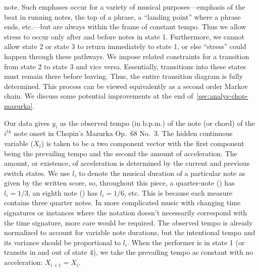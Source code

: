 \documentclass[12pt]{article}
\begin{document}
note. Such emphases occur for a variety of musical purposes---emphasis
of the beat in running notes, the top of a
phrase, a ``landing point'' where a phrase ends, etc.---but are always
within the frame of constant tempo. Thus we allow stress to occur only
after and before notes in state 1. Furthermore, we cannot allow
state 2 or state 3 to return immediately to state 1, or else ``stress'' could
happen through these pathways. We impose related constraints for a transition from state 2
to state 3 and vice versa. Essentially, transitions into these states must remain
there before leaving. Thus, the entire transition diagram is
fully determined. This process can  be viewed equivalently as a second
order Markov chain. We discuss some potential improvements at the end
of~\autoref{sec:analys-chop-mazurka}. 


Our data gives $y_i$ as the observed tempo (in b.p.m.) of the note (or
chord) of the $i^{th}$ note onset in Chopin's Mazurka Op.\ 68 No.\ 3. The
hidden continuous variable ($X_i$) is 
taken to be a two component vector with the first component being the
prevailing tempo and the second the amount of acceleration. The amount, or
existence, of acceleration is determined by the current and previous
switch states. We use $l_i$ to denote the musical duration of
a particular note as given by the written score, so, throughout this piece, a quarter-note (\quarternote) has $l_i=1/3$, an
eighth note (\eighthnote) has $l_i=1/6$, etc. This is because each
measure contains three quarter notes. In more complicated
music with changing time signatures or instances where the notation
doesn't necessarily correspond with the time signature, more care
would be required. The observed tempo is already normalized to account
for variable note durations, but the intentional tempo and its
variance should be proportional to $l_i$. When the performer is in state 1 (or
transits in and out of state 4), we take the prevailing tempo as
constant with no acceleration: $X_{i+1} = X_i$. 
\end{document}

